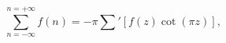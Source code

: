 \begin{equation}\label{sum}
\sum_{n=-\infty}^{n=+\infty} f(n) = - \pi \sum'
[f(z)\cot(\pi z)],
\end{equation}

